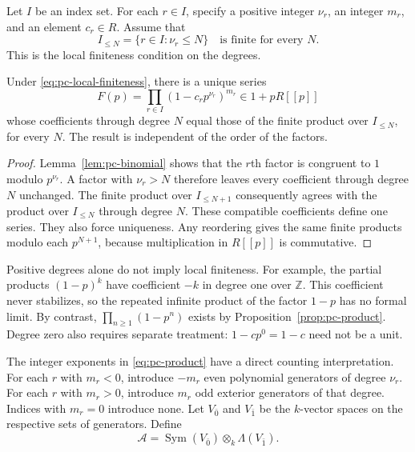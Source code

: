 Let $I$ be an index set. For each $r\in I$, specify a positive integer
$\nu_r$, an integer $m_r$, and an element $c_r\in R$.
Assume that
\begin{equation}
 I_{\leq N}=\{r\in I:\nu_r\leq N\}\quad\text{is finite for every }N.
 \label{eq:pc-local-finiteness}
\end{equation}
This is the local finiteness condition on the degrees.

\begin{proposition}
\label{prop:pc-product}
Under \eqref{eq:pc-local-finiteness}, there is a unique series
\begin{equation}
 F(p)=\prod_{r\in I}(1-c_rp^{\nu_r})^{m_r}\in1+pR[[p]]
 \label{eq:pc-product}
\end{equation}
whose coefficients through degree $N$ equal those of the finite product
over $I_{\leq N}$, for every $N$.
The result is independent of the order of the factors.
\end{proposition}

\begin{proof}
Lemma~\ref{lem:pc-binomial} shows that the $r$th factor is congruent to
$1$ modulo $p^{\nu_r}$. A factor with $\nu_r>N$ therefore leaves every
coefficient through degree $N$ unchanged.
The finite product over $I_{\leq N+1}$ consequently agrees with the product
over $I_{\leq N}$ through degree $N$.
These compatible coefficients define one series. They also force uniqueness.
Any reordering gives the same finite products modulo each $p^{N+1}$,
because multiplication in $R[[p]]$ is commutative.
\end{proof}

Positive degrees alone do not imply local finiteness. For example,
the partial products $(1-p)^k$ have coefficient $-k$ in degree one
over $\mathbb Z$. This coefficient never stabilizes, so the repeated
infinite product of the factor $1-p$ has no formal limit.
By contrast, $\prod_{n\geq1}(1-p^n)$ exists by
Proposition~\ref{prop:pc-product}.
Degree zero also requires separate treatment: $1-cp^0=1-c$ need not
be a unit.

The integer exponents in \eqref{eq:pc-product} have a direct counting
interpretation. For each $r$ with $m_r<0$, introduce $-m_r$ even polynomial
generators of degree $\nu_r$. For each $r$ with $m_r>0$, introduce $m_r$
odd exterior generators of that degree. Indices with $m_r=0$ introduce none.
Let $V_{\bar0}$ and $V_{\bar1}$ be the $k$-vector spaces on the respective
sets of generators. Define
\[
 \mathcal A=\operatorname{Sym}(V_{\bar0})\otimes_k
                 \Lambda(V_{\bar1}).
\]

